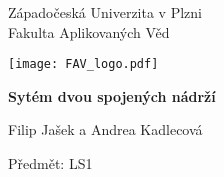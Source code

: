 \documentclass[12pt]{article}
\begin{document}
\begin{titlepage}
\begin{center}
        \huge
        Západočeská Univerzita v Plzni\\
        Fakulta Aplikovaných Věd\\
        
        \vspace{1cm}
        
        \texttt{[image: FAV\_logo.pdf]}
        
        \vspace{4cm}
        \huge
        \textbf{Sytém dvou spojených nádrží}
        
        \vspace{0.5cm}
        \LARGE
        Filip Jašek a Andrea Kadlecová
        
    \end{center} 
    \vfill
        \noindent
        \large
        Předmět: LS1\\
\end{titlepage}
\end{document}
